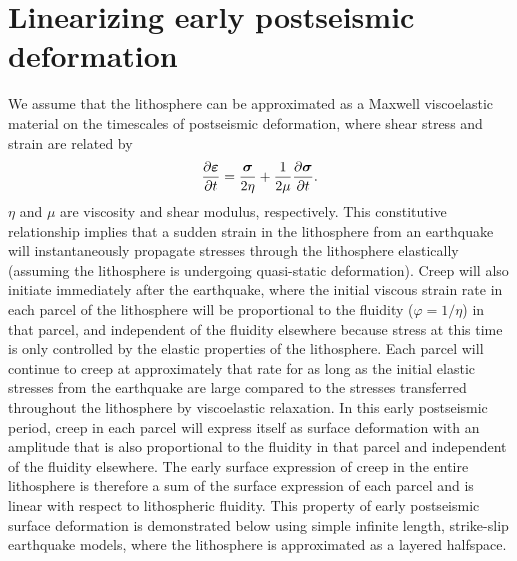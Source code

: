 \documentclass[extra,mreferee]{gji}
\begin{document}
\section{Linearizing early postseismic deformation} 
We assume that the lithosphere can be approximated as a Maxwell
viscoelastic material on the timescales of postseismic deformation,
where shear stress and strain are related by
\begin{equation}
  \frac{\partial\mitbf{\varepsilon}}{\partial t}=\frac{\mitbf{\sigma}}{2\eta} + 
                              \frac{1}{2\mu}\frac{\partial\mitbf{\sigma}}{\partial t}.
\end{equation}
$\eta$ and $\mu$ are viscosity and shear modulus, respectively.  This
constitutive relationship implies that a sudden strain in the
lithosphere from an earthquake will instantaneously propagate stresses
through the lithosphere elastically (assuming the lithosphere is
undergoing quasi-static deformation).  Creep will also initiate
immediately after the earthquake, where the initial viscous strain
rate in each parcel of the lithosphere will be proportional to the
fluidity ($\varphi=1/\eta$) in that parcel, and independent of the
fluidity elsewhere because stress at this time is only controlled by the
elastic properties of the lithosphere.  Each parcel will continue to creep at
approximately that rate for as long as the initial elastic stresses
from the earthquake are large compared to the stresses transferred
throughout the lithosphere by viscoelastic relaxation.  In this early
postseismic period, creep in each parcel will express itself as
surface deformation with an amplitude that is also proportional to the
fluidity in that parcel and independent of the fluidity elsewhere.
The early surface expression of creep in the entire lithosphere is
therefore a sum of the surface expression of each parcel and is linear
with respect to lithospheric fluidity.  This property of early
postseismic surface deformation is demonstrated below using simple
infinite length, strike-slip earthquake models, where the lithosphere
is approximated as a layered halfspace.  
\end{document}
